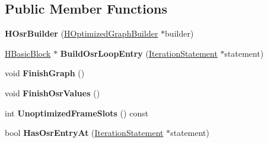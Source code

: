 \subsection*{Public Member Functions}
\begin{DoxyCompactItemize}
\item 
{\bfseries H\+Osr\+Builder} (\hyperlink{classv8_1_1internal_1_1_h_optimized_graph_builder}{H\+Optimized\+Graph\+Builder} $\ast$builder)\hypertarget{classv8_1_1internal_1_1_h_osr_builder_a50e93a01f42e02a6159e136b84476a9a}{}\label{classv8_1_1internal_1_1_h_osr_builder_a50e93a01f42e02a6159e136b84476a9a}

\item 
\hyperlink{classv8_1_1internal_1_1_h_basic_block}{H\+Basic\+Block} $\ast$ {\bfseries Build\+Osr\+Loop\+Entry} (\hyperlink{classv8_1_1internal_1_1_iteration_statement}{Iteration\+Statement} $\ast$statement)\hypertarget{classv8_1_1internal_1_1_h_osr_builder_a162b1e038169ddc7da40528b1abf5e1a}{}\label{classv8_1_1internal_1_1_h_osr_builder_a162b1e038169ddc7da40528b1abf5e1a}

\item 
void {\bfseries Finish\+Graph} ()\hypertarget{classv8_1_1internal_1_1_h_osr_builder_a92e40fe3bf62dba381dbb1f824ebfb52}{}\label{classv8_1_1internal_1_1_h_osr_builder_a92e40fe3bf62dba381dbb1f824ebfb52}

\item 
void {\bfseries Finish\+Osr\+Values} ()\hypertarget{classv8_1_1internal_1_1_h_osr_builder_ab01514c8ab05f66167bbf9c8687eb14e}{}\label{classv8_1_1internal_1_1_h_osr_builder_ab01514c8ab05f66167bbf9c8687eb14e}

\item 
int {\bfseries Unoptimized\+Frame\+Slots} () const \hypertarget{classv8_1_1internal_1_1_h_osr_builder_af42314c459a1aecb58654d0bbafe163f}{}\label{classv8_1_1internal_1_1_h_osr_builder_af42314c459a1aecb58654d0bbafe163f}

\item 
bool {\bfseries Has\+Osr\+Entry\+At} (\hyperlink{classv8_1_1internal_1_1_iteration_statement}{Iteration\+Statement} $\ast$statement)\hypertarget{classv8_1_1internal_1_1_h_osr_builder_aee612515fffa7cee1dc131f66a6fe6db}{}\label{classv8_1_1internal_1_1_h_osr_builder_aee612515fffa7cee1dc131f66a6fe6db}

\end{DoxyCompactItemize}
